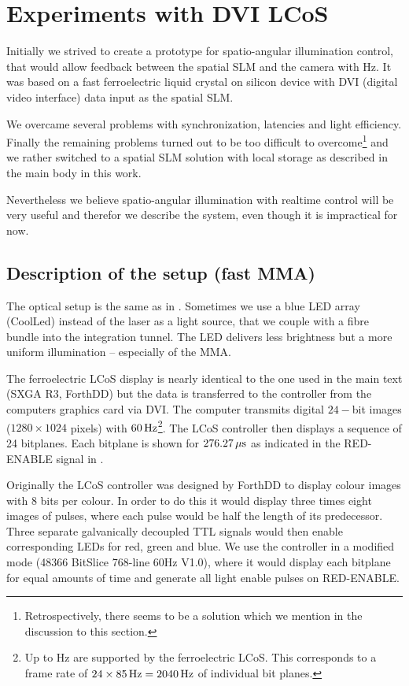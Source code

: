 \chapter{Experiments with DVI LCoS}
\label{sec:dvi}
\begin{summary}
  Initially we strived to create a prototype for spatio-angular
  illumination control, that would allow feedback between the spatial
  SLM and the camera with \unit[60]{Hz}. It was based on a fast
  ferroelectric liquid crystal on silicon device with DVI (digital
  video interface) data input as the spatial SLM.
  
  We overcame several problems with synchronization, latencies and
  light efficiency. Finally the remaining problems turned out to be
  too difficult to overcome\footnote{Retrospectively, there seems to
    be a solution which we mention in the discussion to this section.}
  and we rather switched to a spatial SLM solution with local storage
  as described in the main body in this work.

  Nevertheless we believe spatio-angular illumination with realtime
  control will be very useful and therefor we describe the system,
  even though it is impractical for now.
\end{summary}

\section{Description of the setup (fast MMA)}
The optical setup is the same as in . Sometimes
we use a blue LED array (CoolLed) instead of the laser as a
light source, that we couple with a fibre bundle into the integration
tunnel. The LED delivers less brightness but a more uniform
illumination -- especially of the MMA.

The ferroelectric LCoS display is nearly identical to the one used in
the main text (SXGA R3, ForthDD) but the data is transferred to the
controller from the computers graphics card via DVI. The computer
transmits digital $24-$bit images ($1280\times1024$ pixels) with
$\unit[60]{Hz}$\footnote{Up to \unit[85]{Hz} are supported by the
  ferroelectric LCoS. This corresponds to a frame rate of
  $24\times\unit[85]{Hz}=\unit[2040]{Hz}$ of individual bit
  planes.}. The LCoS controller then displays a sequence of 24
bitplanes. Each bitplane is shown for $\unit[276.27]{\mu s}$ as
indicated in the \textsf{RED-ENABLE} signal in .

Originally the LCoS controller was designed by ForthDD to display
colour images with 8 bits per colour. In order to do this it would
display three times eight images of pulses, where each pulse would be
half the length of its predecessor. Three separate galvanically
decoupled TTL signals would then enable corresponding LEDs for red,
green and blue. We use the controller in a modified mode (48366
BitSlice 768-line 60Hz V1.0), where it would display each bitplane for
equal amounts of time and generate all light enable pulses on
\textsf{RED-ENABLE}.

